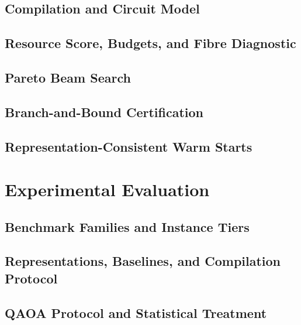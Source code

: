 \documentclass{ieeeaccess}
\begin{document}
\subsection{Compilation and Circuit Model}
\label{sec:selection:model}

\subsection{Resource Score, Budgets, and Fibre Diagnostic}
\label{sec:selection:score}

\subsection{Pareto Beam Search}
\label{sec:selection:beam}

\subsection{Branch-and-Bound Certification}
\label{sec:selection:certification}

\subsection{Representation-Consistent Warm Starts}
\label{sec:selection:warmstart}


\section{Experimental Evaluation}
\label{sec:experiments}

\subsection{Benchmark Families and Instance Tiers}
\label{sec:experiments:benchmarks}

\subsection{Representations, Baselines, and Compilation Protocol}
\label{sec:experiments:protocol}

\subsection{QAOA Protocol and Statistical Treatment}
\label{sec:experiments:qaoa_protocol}
\end{document}
